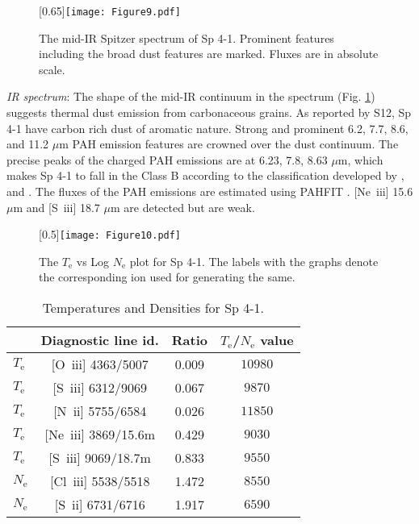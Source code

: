 \documentclass[a4paper,fleqn,usenatbib]{mnras}
\begin{document}
\begin{figure}
\centering
\scalebox{0.65}[0.65]{\texttt{[image: Figure9.pdf]}}
 \caption{The mid-IR Spitzer spectrum of Sp 4-1. Prominent features including the broad dust features are marked. Fluxes are in absolute scale. \label{fig:specmirsp4-1}}
\end{figure}
 
{\textit{IR spectrum}:} The shape of the mid-IR continuum in the spectrum (Fig. \ref{fig:specmirsp4-1}) suggests thermal dust emission from carbonaceous grains. As reported by S12, Sp 4-1 have carbon rich dust of aromatic nature. Strong and prominent 6.2, 7.7, 8.6, and 11.2 $\mu$m PAH emission features are crowned over the dust continuum. The precise peaks of the charged PAH emissions are at 6.23, 7.8, 8.63 $\mu$m, which makes Sp 4-1 to fall in the Class B according to the classification developed by \citet{2002A&A...390.1089P}, and \citet{2004ApJ...611..928V}. The fluxes of the PAH emissions are estimated using PAHFIT \citep{2007ApJ...656..770S}. [Ne~{\sc iii}] 15.6 $\mu$m and [S~{\sc iii}] 18.7 $\mu$m are detected but are weak. 

\begin{figure}
\scalebox{0.5}[0.5]{\texttt{[image: Figure10.pdf]}}
 \caption{The $T_\mathrm{e}$ vs Log $N_\mathrm{e}$ plot for Sp 4-1. The labels with the graphs denote the corresponding ion used for generating the same. \label{fig:tenesp4-1}}
\end{figure} 

\begin{table}
\centering
\small
\caption{Temperatures and Densities for Sp 4-1. \label{tab:tenesp4-1}}
 \begin{tabular}{lccc}
 \hline
& Diagnostic line id. & Ratio & $T_\mathrm{e}$/$N_\mathrm{e}$ value\\
 \hline
$T_\mathrm{e}$ & [O~{\sc iii}] 4363/5007 & 0.009 & ${10980}$\\
$T_\mathrm{e}$ & [S~{\sc iii}] 6312/9069 & 0.067 & ${9870}$\\
$T_\mathrm{e}$ & [N~{\sc ii}] 5755/6584 & 0.026 & ${11850}$\\
$T_\mathrm{e}$ & [Ne~{\sc iii}] 3869/15.6m & 0.429 & ${9030}$\\
$T_\mathrm{e}$ & [S~{\sc iii}] 9069/18.7m & 0.833 & ${9550}$\\
 \hline
$N_\mathrm{e}$ & [Cl~{\sc iii}] 5538/5518 & 1.472 & ${8550}$\\
$N_\mathrm{e}$ & [S~{\sc ii}] 6731/6716 & 1.917 & ${6590}$\\
 \hline
 \end{tabular}
\end{table} 
\end{document}
